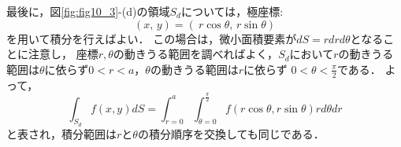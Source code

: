 \documentclass[10pt,a4j]{jarticle}
\begin{document}
最後に，図\ref{fig:fig10_3}-(d)の領域$S_d$については，極座標:
\begin{equation}
	\left(x,\,y\right) = \left(\ r\cos\theta,\, r\sin\theta \right)
	\label{eqn:cart2pol}
\end{equation}
を用いて積分を行えばよい．
この場合は，微小面積要素が$dS=r dr d\theta $となることに注意し，
座標$r,\theta$の動きうる範囲を調べればよく，$S_d$において$r$の動きうる
範囲は$\theta$に依らず$0<r<a$，$\theta$の動きうる範囲は$r$に依らず
$0<\theta<\frac{\pi}{2}$である．
よって，
\begin{equation}
	\int_{S_d} f(x,y) dS
	=
	\int_{r=0}^a \int_{\theta=0}^{\frac{\pi}{2}} f(r\cos\theta,r\sin\theta)rd\theta dr
	\label{eqn:int_pol}
\end{equation}
と表され，積分範囲は$r$と$\theta$の積分順序を交換しても同じである．
\end{document}
